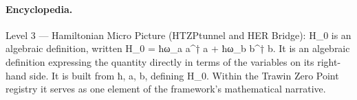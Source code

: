 \paragraph{Encyclopedia.}
Level 3 — Hamiltonian Micro Picture (HTZPtunnel and HER Bridge): H\_0 is an algebraic definition, written H\_0 = ħω\_a a\textasciicircum{}† a + ħω\_b b\textasciicircum{}† b. It is an algebraic definition expressing the quantity directly in terms of the variables on its right-hand side. It is built from ħ, a, b, defining H\_0. Within the Trawin Zero Point registry it serves as one element of the framework's mathematical narrative.
